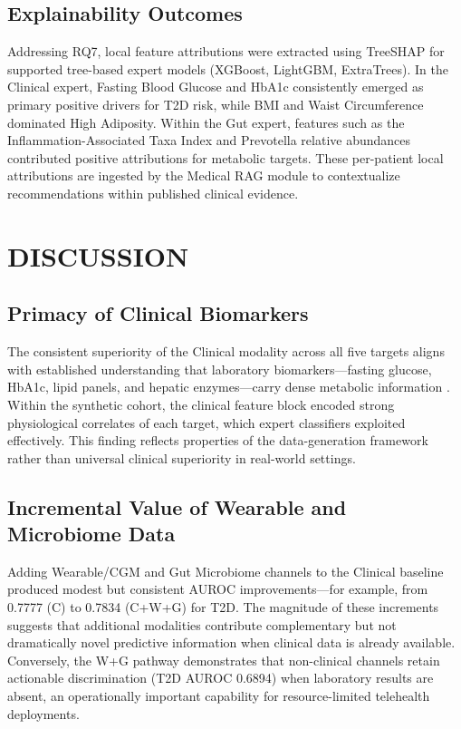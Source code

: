 \documentclass[10pt,twocolumn,letterpaper]{article}
\begin{document}
\subsection{Explainability Outcomes}
Addressing RQ7, local feature attributions were extracted using TreeSHAP \citep{lundberg2017unified} for supported tree-based expert models (XGBoost, LightGBM, ExtraTrees). In the Clinical expert, Fasting Blood Glucose and HbA1c consistently emerged as primary positive drivers for T2D risk, while BMI and Waist Circumference dominated High Adiposity. Within the Gut expert, features such as the Inflammation-Associated Taxa Index and Prevotella relative abundances contributed positive attributions for metabolic targets. These per-patient local attributions are ingested by the Medical RAG module to contextualize recommendations within published clinical evidence.

\section{DISCUSSION}

\subsection{Primacy of Clinical Biomarkers}
The consistent superiority of the Clinical modality across all five targets aligns with established understanding that laboratory biomarkers---fasting glucose, HbA1c, lipid panels, and hepatic enzymes---carry dense metabolic information \citep{rajkomar2018scalable}. Within the synthetic cohort, the clinical feature block encoded strong physiological correlates of each target, which expert classifiers exploited effectively. This finding reflects properties of the data-generation framework rather than universal clinical superiority in real-world settings.

\subsection{Incremental Value of Wearable and Microbiome Data}
Adding Wearable/CGM and Gut Microbiome channels to the Clinical baseline produced modest but consistent AUROC improvements---for example, from 0.7777 (C) to 0.7834 (C+W+G) for T2D. The magnitude of these increments suggests that additional modalities contribute complementary but not dramatically novel predictive information when clinical data is already available. Conversely, the W+G pathway demonstrates that non-clinical channels retain actionable discrimination (T2D AUROC 0.6894) when laboratory results are absent, an operationally important capability for resource-limited telehealth deployments.
\end{document}
